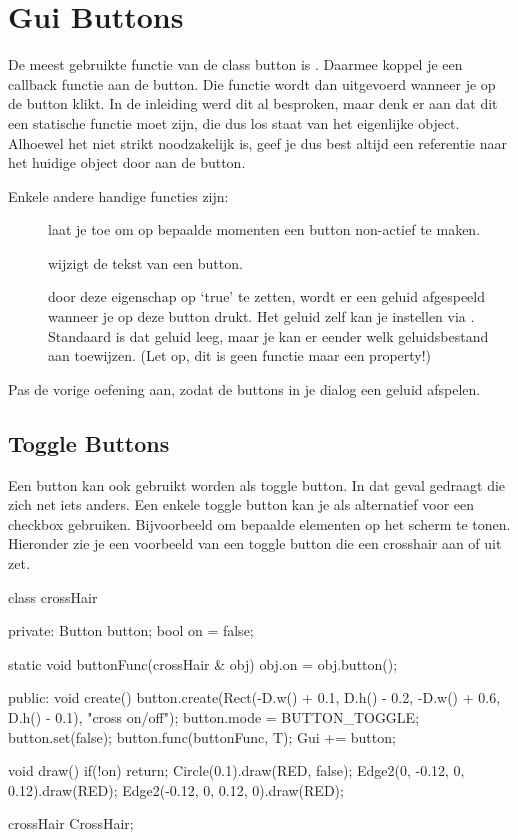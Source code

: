 \chapter{Gui Buttons}

De meest gebruikte functie van de class button is . Daarmee koppel je een callback functie aan de button. Die functie wordt dan uitgevoerd wanneer je op de button klikt. In de inleiding werd dit al besproken, maar denk er aan dat dit een statische functie moet zijn, die dus los staat van het eigenlijke object. Alhoewel het niet strikt noodzakelijk is, geef je dus best altijd een referentie naar het huidige object door aan de button. 

Enkele andere handige functies zijn:

\begin{description}
	\item[] laat je toe om op bepaalde momenten een button non-actief te maken.
	\item[] wijzigt de tekst van een button.
	\item[] door deze eigenschap op `true' te zetten, wordt er een geluid afgespeeld wanneer je op deze button drukt. Het geluid zelf kan je instellen via . Standaard is dat geluid leeg, maar je kan er eender welk geluidsbestand aan toewijzen. (Let op, dit is geen functie maar een property!)
\end{description}

\begin{exercise}
Pas de vorige oefening aan, zodat de buttons in je dialog een geluid afspelen.
\end{exercise}

\section{Toggle Buttons}
Een button kan ook gebruikt worden als toggle button. In dat geval gedraagt die zich net iets anders. Een enkele toggle button kan je als alternatief voor een checkbox gebruiken. Bijvoorbeeld om bepaalde elementen op het scherm te tonen. Hieronder zie je een voorbeeld van een toggle button die een crosshair aan of uit zet.

\begin{code}
class crossHair
{
private:
   Button button;
   bool on = false;
   
   static void buttonFunc(crossHair & obj)
   {
      obj.on = obj.button();
   }
   
public:
   void create()
   {
      button.create(Rect(-D.w() + 0.1, D.h() - 0.2, -D.w() + 0.6, D.h() - 0.1), "cross on/off");
      button.mode = BUTTON_TOGGLE;
      button.set(false);
      button.func(buttonFunc, T);
      Gui += button;
   }
   
   void draw()
   {
      if(!on) return;
      Circle(0.1).draw(RED, false);
      Edge2(0, -0.12, 0, 0.12).draw(RED);
      Edge2(-0.12, 0, 0.12, 0).draw(RED);
   }
}

crossHair CrossHair;
\end{code}

